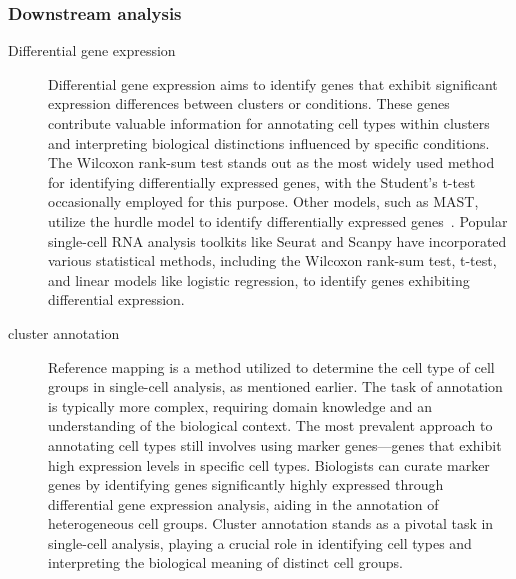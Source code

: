 \subsubsection{Downstream analysis}
\begin{description}
	\item[Differential gene expression] 
	Differential gene expression aims to identify genes that exhibit significant expression differences between clusters or conditions. These genes contribute valuable information for annotating cell types within clusters and interpreting biological distinctions influenced by specific conditions. The Wilcoxon rank-sum test stands out as the most widely used method for identifying differentially expressed genes, with the Student's t-test occasionally employed for this purpose. Other models, such as MAST, utilize the hurdle model to identify differentially expressed genes~\citep{finak2015mast}. Popular single-cell RNA analysis toolkits like Seurat and Scanpy have incorporated various statistical methods, including the Wilcoxon rank-sum test, t-test, and linear models like logistic regression, to identify genes exhibiting differential expression.

	\item[cluster annotation]
	Reference mapping is a method utilized to determine the cell type of cell groups in single-cell analysis, as mentioned earlier. The task of annotation is typically more complex, requiring domain knowledge and an understanding of the biological context. The most prevalent approach to annotating cell types still involves using marker genes—genes that exhibit high expression levels in specific cell types. Biologists can curate marker genes by identifying genes significantly highly expressed through differential gene expression analysis, aiding in the annotation of heterogeneous cell groups. Cluster annotation stands as a pivotal task in single-cell analysis, playing a crucial role in identifying cell types and interpreting the biological meaning of distinct cell groups.


\end{description}
